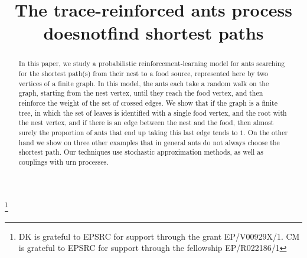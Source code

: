 \documentclass[JEP,XML,SOM,Unicode,NoFloatCountersInSection,published]{cedram}
\numberwithin{equation}{section}
\theoremstyle{definition}
\begin{document}
\title{The trace-reinforced ants process does\nobreakspace not\nobreakspace find shortest paths}

\author[\initial{D.} \lastname{Kious}]{ }
\address{Department of Mathematical Sciences, University of Bath\\
Claverton Down, BA2 7AY Bath, UK.}

\author[\initial{C.} \lastname{Mailler}]{ }
\address{Department of Mathematical Sciences, University of Bath\\
Claverton Down, BA2 7AY Bath, UK.}

\author[\initial{B.} \lastname{Schapira}]{ }
\address{Aix-Marseille Université, CNRS, Centrale Marseille, I2M, UMR 7373\\
13453 Marseille, France}

\thanks{DK is grateful to EPSRC for support through the grant EP/V00929X/1. CM is grateful to EPSRC for support through the fellowship EP/R022186/1}

\begin{abstract}
In this paper, we study a probabilistic reinforcement-learning model for ants searching for the shortest path(s) from their nest to a food source, represented here by two vertices of a finite graph. In this model, the ants each take a random walk on the graph, starting from the nest vertex, until they reach the food vertex, and then reinforce the weight of the set of crossed edges. We show that if the graph is a finite tree, in which the set of leaves is identified with a single food vertex, and the root with the nest vertex, and if there is an edge between the nest and the food, then almost surely the proportion of ants that end up taking this last edge tends to $1$. On the other hand we show on three other examples that in general ants do not always choose the shortest path. Our techniques use stochastic approximation methods, as well as couplings with urn processes.
\end{abstract}



\end{document}
